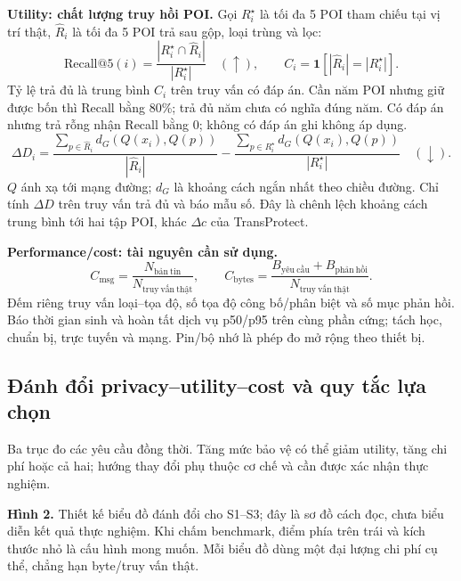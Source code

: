 \documentclass[10pt,a4paper]{article}
\newcommand{\up}{\ensuremath{\uparrow}}\newcommand{\down}{\ensuremath{\downarrow}}
\begin{document}
\textbf{Utility: chất lượng truy hồi POI.} Gọi $R_i^\star$ là tối đa 5 POI tham chiếu tại vị trí thật, $\widehat R_i$ là tối đa 5 POI trả sau gộp, loại trùng và lọc:
\[
\mathrm{Recall@5}(i)=\frac{|R_i^\star\cap\widehat R_i|}{|R_i^\star|}\quad(\up),\qquad
C_i=\mathbf1[|\widehat R_i|=|R_i^\star|].
\]
Tỷ lệ trả đủ là trung bình $C_i$ trên truy vấn có đáp án. Cần năm POI nhưng giữ được bốn thì Recall bằng 80\%; trả đủ năm chưa có nghĩa đúng năm. Có đáp án nhưng trả rỗng nhận Recall bằng 0; không có đáp án ghi không áp dụng.
\[
\Delta D_i=\frac{\sum_{p\in\widehat R_i}d_G(Q(x_i),Q(p))}{|\widehat R_i|}
-\frac{\sum_{p\in R_i^\star}d_G(Q(x_i),Q(p))}{|R_i^\star|}\quad(\down).
\]
$Q$ ánh xạ tới mạng đường; $d_G$ là khoảng cách ngắn nhất theo chiều đường. Chỉ tính $\Delta D$ trên truy vấn trả đủ và báo mẫu số. Đây là chênh lệch khoảng cách trung bình tới hai tập POI, khác $\Delta c$ của TransProtect.

\textbf{Performance/cost: tài nguyên cần sử dụng.}
\[
C_{\mathrm{msg}}=\frac{N_{\mathrm{bản\ tin}}}{N_{\mathrm{truy\ vấn\ thật}}},\qquad
C_{\mathrm{bytes}}=\frac{B_{\mathrm{yêu\ cầu}}+B_{\mathrm{phản\ hồi}}}{N_{\mathrm{truy\ vấn\ thật}}}.
\]
Đếm riêng truy vấn loại--tọa độ, số tọa độ công bố/phân biệt và số mục phản hồi. Báo thời gian sinh và hoàn tất dịch vụ p50/p95 trên cùng phần cứng; tách học, chuẩn bị, trực tuyến và mạng. Pin/bộ nhớ là phép đo mở rộng theo thiết bị.

\newpage
\subsection{Đánh đổi privacy--utility--cost và quy tắc lựa chọn}
Ba trục đo các yêu cầu đồng thời. Tăng mức bảo vệ có thể giảm utility, tăng chi phí hoặc cả hai; hướng thay đổi phụ thuộc cơ chế và cần được xác nhận thực nghiệm.
\begin{center}
\end{center}
\textbf{Hình 2.} Thiết kế biểu đồ đánh đổi cho S1--S3; đây là sơ đồ cách đọc, chưa biểu diễn kết quả thực nghiệm. Khi chấm benchmark, điểm phía trên trái và kích thước nhỏ là cấu hình mong muốn. Mỗi biểu đồ dùng một đại lượng chi phí cụ thể, chẳng hạn byte/truy vấn thật.
\end{document}
